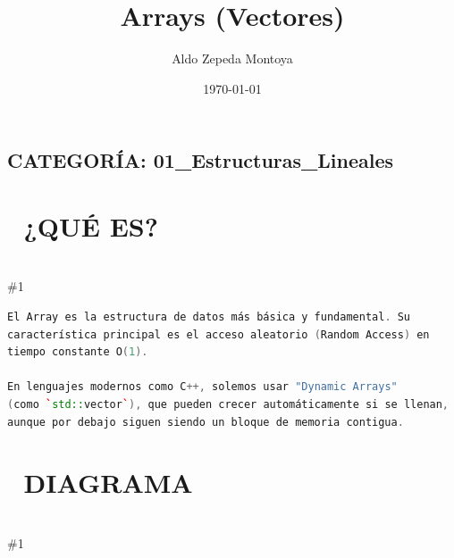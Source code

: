 \documentclass{article}
\newcommand{\quees}[1]{
    \section*{🤔 ¿QUÉ ES?}
    \hrulefill \\
    \#1
}
\newcommand{\diagrama}[1]{
    \section*{🎨 DIAGRAMA}
    \hrulefill \\
    \#1
}
\begin{document}
\title{Arrays (Vectores)}
\author{Aldo Zepeda Montoya}
\date{\today}
\maketitle

\subsection*{CATEGORÍA: 01\_Estructuras\_Lineales}

\quees{
Los vagones de un tren 🚂 numerados en orden. El vagón 0, el vagón 1,
el vagón 2... Cada vagón tiene exactamente UN pasajero (dato).

Para subir a cualquier vagón, solo dices el número (el índice) y 
¡listo! No tienes que pasar por todos los vagones anteriores. 
Esto es posible porque todos los vagones están pegaditos uno tras
otro en la vía.

Un array es una colección de elementos del mismo tipo guardados en 
posiciones de memoria CONTIGUAS (una tras otra).
}

\begin{lstlisting}[language=C++]
El Array es la estructura de datos más básica y fundamental. Su
característica principal es el acceso aleatorio (Random Access) en
tiempo constante O(1). 

En lenguajes modernos como C++, solemos usar "Dynamic Arrays" 
(como `std::vector`), que pueden crecer automáticamente si se llenan,
aunque por debajo siguen siendo un bloque de memoria contigua.
\end{lstlisting}

\diagrama{\begin{verbatim}
Índice:  [0] [1] [2] [3] [4]
Valor:   [ 5][ 2][ 8][ 1][ 9]
          ↑
    Dirección de memoria contigua →→→→→→→→→→

Insertar 99 en el índice 2:
ANTES:   [ 5][ 2][ 8][ 1][ 9]
          ↓   ↓   ← desplazar →
DESPUÉS: [ 5][ 2][99][ 8][ 1][ 9]   ← O(n) porque movimos 8, 1 y 9
\end{verbatim}}
\end{document}

